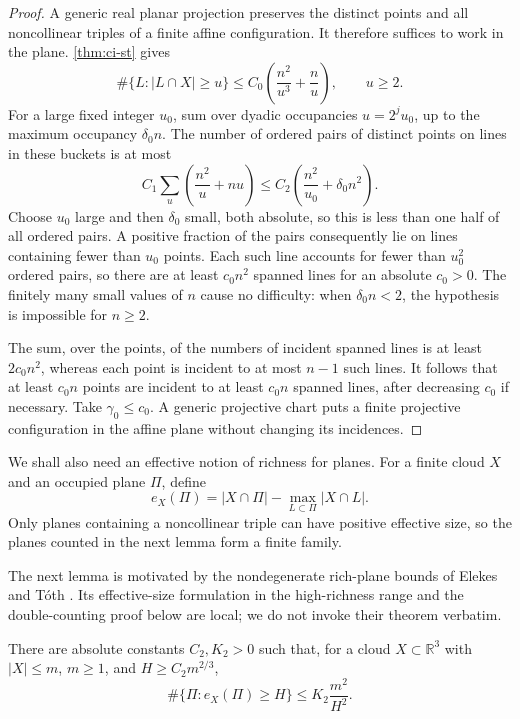 \begin{proof}
A generic real planar projection preserves the distinct points and all noncollinear triples of a finite affine configuration.  It therefore suffices to work in the plane.  \cref{thm:ci-st} gives
\begin{equation}
\label{eq:mot-st-rich}
 \#\{L:|L\cap X|\ge u\}
 \le C_0\left(\frac{n^2}{u^3}+\frac nu\right),
 \qquad u\ge2.
\end{equation}
For a large fixed integer $u_0$, sum over dyadic occupancies $u=2^j u_0$, up to the maximum occupancy $\delta_0 n$. The number of ordered pairs of distinct points on lines in these buckets is at most
\[
 C_1\sum_{u}
 \left(\frac{n^2}{u}+nu\right)
 \le C_2\left(\frac{n^2}{u_0}+\delta_0 n^2\right).
\]
Choose $u_0$ large and then $\delta_0$ small, both absolute, so this is less than one half of all ordered pairs.  A positive fraction of the pairs consequently lie on lines containing fewer than $u_0$ points.  Each such line accounts for fewer than $u_0^2$ ordered pairs, so there are at least $c_0n^2$ spanned lines for an absolute $c_0>0$.  The finitely many small values of $n$ cause no difficulty: when $\delta_0n<2$, the hypothesis is impossible for $n\ge2$.

The sum, over the points, of the numbers of incident spanned lines is at least $2c_0n^2$, whereas each point is incident to at most $n-1$ such lines.  It follows that at least $c_0n$ points are incident to at least $c_0n$ spanned lines, after decreasing $c_0$ if necessary.  Take $\gamma_0\le c_0$. A generic projective chart puts a finite projective configuration in the affine plane without changing its incidences.
\end{proof}

We shall also need an effective notion of richness for planes. For a finite cloud $X$ and an occupied plane $\Pi$, define
\[
 e_X(\Pi)
 =|X\cap\Pi|-\max_{L\subset\Pi}|X\cap L|.
\]
Only planes containing a noncollinear triple can have positive effective size, so the planes counted in the next lemma form a finite family.

The next lemma is motivated by the nondegenerate rich-plane bounds of Elekes and T\'oth \cite{elekestoth2005}.  Its effective-size formulation in the high-richness range and the double-counting proof below are local; we do not invoke their theorem verbatim.

\begin{lemma}
\label{lem:mot-effective-planes}
There are absolute constants $C_2,K_2>0$ such that, for a cloud $X\subset\mathbb{R}^3$ with $|X|\le m$, $m\ge1$, and $H\ge C_2m^{2/3}$,
\[
 \#\{\Pi:e_X(\Pi)\ge H\}\le K_2\frac{m^2}{H^2}.
\]
\end{lemma}

